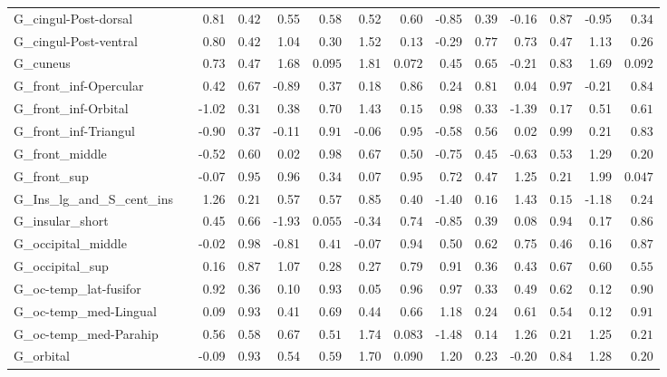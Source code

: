 {\begin{longtable}{llrrrrrrrrrrrr}
G\_cingul-Post-dorsal &  & 0.81 & $0.42$ & 0.55 & $0.58$ & 0.52 & $0.60$ & -0.85 & $0.39$ & -0.16 & $0.87$ & -0.95 & $0.34$ \\
G\_cingul-Post-ventral &  & 0.80 & $0.42$ & 1.04 & $0.30$ & 1.52 & $0.13$ & -0.29 & $0.77$ & 0.73 & $0.47$ & 1.13 & $0.26$ \\
G\_cuneus &  & 0.73 & $0.47$ & 1.68 & $0.095$ & 1.81 & $0.072$ & 0.45 & $0.65$ & -0.21 & $0.83$ & 1.69 & $0.092$ \\
G\_front\_inf-Opercular &  & 0.42 & $0.67$ & -0.89 & $0.37$ & 0.18 & $0.86$ & 0.24 & $0.81$ & 0.04 & $0.97$ & -0.21 & $0.84$ \\
G\_front\_inf-Orbital &  & -1.02 & $0.31$ & 0.38 & $0.70$ & 1.43 & $0.15$ & 0.98 & $0.33$ & -1.39 & $0.17$ & 0.51 & $0.61$ \\
G\_front\_inf-Triangul &  & -0.90 & $0.37$ & -0.11 & $0.91$ & -0.06 & $0.95$ & -0.58 & $0.56$ & 0.02 & $0.99$ & 0.21 & $0.83$ \\
G\_front\_middle &  & -0.52 & $0.60$ & 0.02 & $0.98$ & 0.67 & $0.50$ & -0.75 & $0.45$ & -0.63 & $0.53$ & 1.29 & $0.20$ \\
G\_front\_sup &  & -0.07 & $0.95$ & 0.96 & $0.34$ & 0.07 & $0.95$ & 0.72 & $0.47$ & 1.25 & $0.21$ & 1.99 & $0.047$ \\
G\_Ins\_lg\_and\_S\_cent\_ins &  & 1.26 & $0.21$ & 0.57 & $0.57$ & 0.85 & $0.40$ & -1.40 & $0.16$ & 1.43 & $0.15$ & -1.18 & $0.24$ \\
G\_insular\_short &  & 0.45 & $0.66$ & -1.93 & $0.055$ & -0.34 & $0.74$ & -0.85 & $0.39$ & 0.08 & $0.94$ & 0.17 & $0.86$ \\
G\_occipital\_middle &  & -0.02 & $0.98$ & -0.81 & $0.41$ & -0.07 & $0.94$ & 0.50 & $0.62$ & 0.75 & $0.46$ & 0.16 & $0.87$ \\
G\_occipital\_sup &  & 0.16 & $0.87$ & 1.07 & $0.28$ & 0.27 & $0.79$ & 0.91 & $0.36$ & 0.43 & $0.67$ & 0.60 & $0.55$ \\
G\_oc-temp\_lat-fusifor &  & 0.92 & $0.36$ & 0.10 & $0.93$ & 0.05 & $0.96$ & 0.97 & $0.33$ & 0.49 & $0.62$ & 0.12 & $0.90$ \\
G\_oc-temp\_med-Lingual &  & 0.09 & $0.93$ & 0.41 & $0.69$ & 0.44 & $0.66$ & 1.18 & $0.24$ & 0.61 & $0.54$ & 0.12 & $0.91$ \\
G\_oc-temp\_med-Parahip &  & 0.56 & $0.58$ & 0.67 & $0.51$ & 1.74 & $0.083$ & -1.48 & $0.14$ & 1.26 & $0.21$ & 1.25 & $0.21$ \\
G\_orbital &  & -0.09 & $0.93$ & 0.54 & $0.59$ & 1.70 & $0.090$ & 1.20 & $0.23$ & -0.20 & $0.84$ & 1.28 & $0.20$ \\

\end{longtable}}
